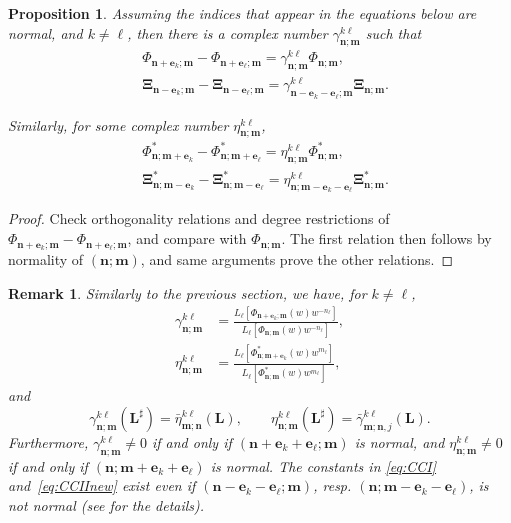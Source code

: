 \documentclass[reqno,centertags,11pt,draft]{amsart}
\newtheorem{prop}[thm]{Proposition}
\newtheorem{rem}[thm]{Remark}
\begin{document}
\begin{prop}\label{pr:compPoly1}
Assuming the indices that appear in the equations below are normal, and $k \neq \ell$, then there is a complex number $\gamma_{\bm{n};\bm{m}}^{k\ell}$ such that
\begin{align}\label{eq:CCII}
    & \Phi_{\bm{n}+\bm{e}_k;\bm{m}}-\Phi_{\bm{n}+\bm{e}_\ell;\bm{m}} = \gamma_{\bm{n};\bm{m}}^{k\ell}\Phi_{\bm{n};\bm{m}},
\\
\label{eq:CCI}
    & \bm\Xi_{\bm{n}-\bm{e}_k;\bm{m}}-\bm\Xi_{\bm{n}-\bm{e}_\ell;\bm{m}} = \gamma_{\bm{n}-\bm{e}_k-\bm{e}_\ell;\bm{m}}^{k\ell}\bm\Xi_{\bm{n};\bm{m}}.
\end{align}

Similarly, for some complex number $\eta_{\bm{n};\bm{m}}^{k\ell}$,
\begin{align}\label{eq:CCII2}
    & \Phi^*_{\bm{n};\bm{m}+\bm{e}_k}-\Phi^*_{\bm{n};\bm{m}+\bm{e}_\ell} = \eta_{\bm{n};\bm{m}}^{k\ell}\Phi^*_{\bm{n};\bm{m}},
    \\
    \label{eq:CCIInew}
    & \bm\Xi^*_{\bm{n};\bm{m}-\bm{e}_k}-\bm\Xi^*_{\bm{n};\bm{m}-\bm{e}_\ell} = \eta_{\bm{n};\bm{m}-\bm{e}_k-\bm{e}_\ell}^{k\ell}\bm\Xi^*_{\bm{n};\bm{m}}.
\end{align}
\end{prop}

\begin{proof}
    Check orthogonality relations and degree restrictions of $\Phi_{\bm{n}+\bm{e}_k;\bm{m}}-\Phi_{\bm{n}+\bm{e}_\ell;\bm{m}}$, and compare with $\Phi_{\bm{n};\bm{m}}$. The first relation then follows by normality of $(\bm{n};\bm{m})$, and same arguments prove the other relations. 
\end{proof}

\begin{rem}
    Similarly to the previous section, we have, for $k\ne \ell$,
    \begin{align}\label{eq:gamma}
    \gamma^{k\ell}_{\bm{n};\bm{m}} &= \frac{L_\ell[\Phi_{\bm{n}+\bm{e}_k;\bm{m}}(w)w^{-n_\ell}]}{L_\ell[\Phi_{\bm{n};\bm{m}}(w)w^{-n_\ell}]},
    \\\label{eq:eta}
    \eta^{k\ell}_{\bm{n};\bm{m}} &= \frac{L_\ell[\Phi^*_{\bm{n};\bm{m}+\bm{e}_k}(w)w^{m_\ell}]}{L_\ell[\Phi^*_{\bm{n};\bm{m}}(w)w^{m_\ell}]},
    \end{align}
    and  
    \begin{equation}
             \gamma_{\bm{n};\bm{m}}^{k\ell}(\bm{L}^\sharp) = \bar\eta_{\bm{m};\bm{n}}^{k\ell}(\bm{L}), \qquad \eta_{\bm{n};\bm{m}}^{k\ell}(\bm{L}^\sharp) = \bar\gamma_{\bm{m};\bm{n},j}^{k\ell}(\bm{L}).
    \end{equation}
    Furthermore, $\gamma^{k\ell}_{\bm{n};\bm{m}} \neq 0$ if and only if $(\bm{n}+\bm{e}_k+\bm{e}_\ell;\bm{m})$ is normal, and $\eta_{\bm{n};\bm{m}}^{k\ell} \neq 0$ if and only if $(\bm{n};\bm{m}+\bm{e}_k+\bm{e}_\ell)$ is normal. The constants in \eqref{eq:CCI} and~\eqref{eq:CCIInew} exist even if $(\bm{n}-\bm{e}_k-\bm{e}_\ell;\bm{m})$, resp. $(\bm{n};\bm{m}-\bm{e}_k-\bm{e}_\ell)$, is not normal (see \cite{KVMOPUC} for the details).
\end{rem}
\end{document}
